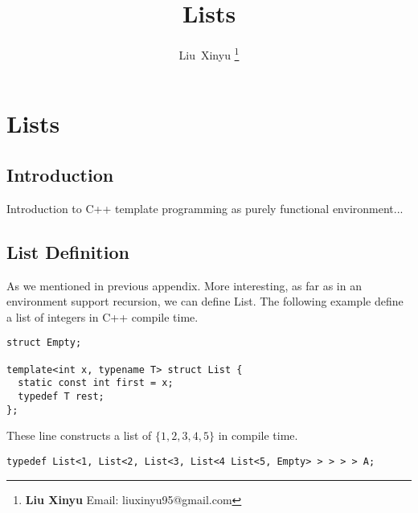 \documentclass{article}
\begin{document}
\fi


\title{Lists}

\author{Liu~Xinyu
\thanks{{\bfseries Liu Xinyu } \newline
  Email: liuxinyu95@gmail.com \newline}
  }


\maketitle

\ifx\wholebook\relax
\chapter{Lists}
\fi

\section{Introduction}
\label{introduction}

Introduction to C++ template programming as purely functional environment...


\section{List Definition}

As we mentioned in previous appendix.
More interesting, as far as in an environment support recursion, we can define List. The following
example define a list of integers in C++ compile time.

\lstset{language=C++}
\begin{lstlisting}
struct Empty;

template<int x, typename T> struct List {
  static const int first = x;
  typedef T rest;
};
\end{lstlisting}

These line constructs a list of $\{1, 2, 3, 4, 5\}$ in compile time.

\begin{lstlisting}
typedef List<1, List<2, List<3, List<4 List<5, Empty> > > > > A;
\end{lstlisting}
\end{document}
